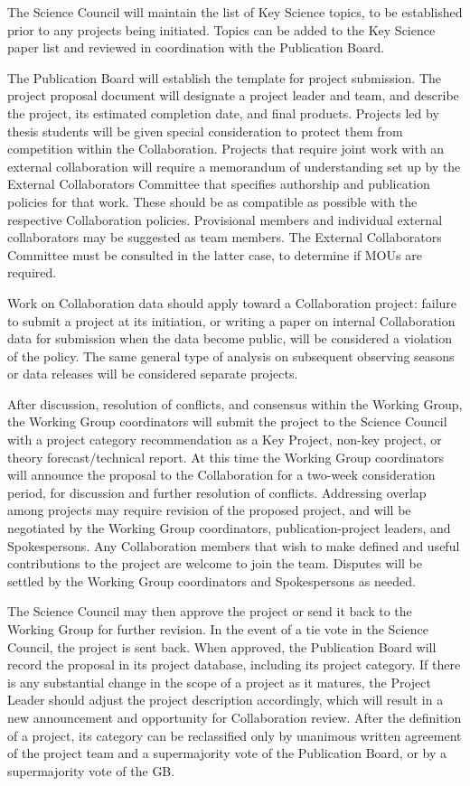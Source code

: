 \documentclass[12pt]{article}
\begin{document}
The Science Council will maintain the list of Key Science topics, to be established prior to any projects being initiated.  Topics can be added to the Key Science paper list and reviewed in coordination with the Publication Board.

The Publication Board will establish the template for project submission.  The project proposal document will designate a project leader and team, and describe the project, its estimated completion date, and final products.  
Projects led by thesis students will be given special consideration to protect them from competition within the Collaboration.  Projects that require joint work with an external collaboration will require a memorandum of understanding set up by the External Collaborators Committee that specifies authorship and publication policies for that work.  These should be as compatible as possible with the respective Collaboration policies.  Provisional members and individual external collaborators may be suggested as team members.  The External Collaborators Committee must be consulted in the latter case, to determine if MOUs are required.  

Work on Collaboration data should apply toward a Collaboration project: failure to submit a project at its initiation, or writing a paper on internal Collaboration data for submission when the data become public, will be considered a violation of the policy.  The same general type of analysis on subsequent observing seasons or data releases will be considered separate projects.

After discussion, resolution of conflicts, and consensus within the Working Group, the Working Group coordinators will submit the project to the Science Council with a project category recommendation as a Key Project, non-key project, or theory forecast/technical report.  At this time the Working Group coordinators will announce the proposal to the Collaboration for a two-week consideration period, for discussion and further resolution of conflicts.  Addressing overlap among projects may require revision of the proposed project, and will be negotiated by the Working Group coordinators, publication-project leaders, and Spokespersons.  Any Collaboration members that wish to make defined and useful contributions to the project are welcome to join the team.  Disputes will be settled by the Working Group coordinators and Spokespersons as needed.  

The Science Council may then approve the project or send it back to the Working Group for further revision.  In the event of a tie vote in the Science Council, the project is sent back.  When approved, the Publication Board will record the proposal in its project database, including its project category.  If there is any substantial change in the scope of a project as it matures, the Project Leader should adjust the project description accordingly, which will result in a new announcement and opportunity for Collaboration review.  After the definition of a project, its category can be reclassified only by unanimous written agreement of the project team and a supermajority vote of the Publication Board,  or by a supermajority vote of the GB.
\end{document}
